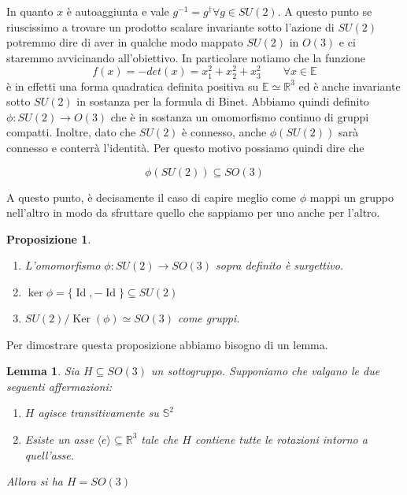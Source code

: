 \documentclass[11pt]{article}
\theoremstyle{plain}
\newtheorem{lemma}[thm]{Lemma}
\newtheorem{prop}[thm]{Proposizione}
\theoremstyle{definition}
\theoremstyle{remark}
\newcommand{\R}{\mathbb{R}}
\DeclareMathOperator{\Ker}{Ker}
\DeclareMathOperator{\Id}{Id}
\DeclareMathOperator{\iso}{\simeq}
\begin{document}
 In quanto $x$ è autoaggiunta e vale $g^{-1} = g^\dag \forall g \in SU(2)$. A questo punto se riuscissimo a trovare un prodotto scalare invariante sotto l'azione di $SU(2)$ potremmo dire di aver in qualche modo mappato $SU(2)$ in $O(3)$ e ci staremmo avvicinando all'obiettivo. In particolare notiamo che la funzione
 \[ f(x) = -det (x) = x_1 ^2 + x_2^2 + x_3^2 \qquad \forall x \in \mathbb{E}\]
 è in effetti una forma quadratica definita positiva su $\mathbb{E} \iso \R^3$ ed è anche invariante sotto $SU(2)$ in sostanza per la formula di Binet. Abbiamo quindi definito $\phi: SU(2) \to O(3)$ che è in sostanza un omomorfismo continuo di gruppi compatti. Inoltre, dato che $SU(2)$ è connesso, anche $\phi(SU(2))$ sarà connesso e conterrà l'identità. Per questo motivo possiamo quindi dire che

 \[ \phi(SU(2)) \subseteq SO(3) \]

 A questo punto, è decisamente il caso di capire meglio come $\phi$ mappi un gruppo nell'altro in modo da sfruttare quello che sappiamo per uno anche per l'altro.



 \begin{prop}
   \label{prop:omo su2 so3}
  \begin{enumerate}
    \item L'omomorfismo $\phi : SU(2) \to SO(3)$ sopra definito è surgettivo.
    \item $\ker \phi = \{\Id, -\Id\}\subseteq SU(2)$
    \item $SU(2) / \Ker(\phi) \iso SO(3)$ come gruppi.
  \end{enumerate}
  \end{prop}

Per dimostrare questa proposizione abbiamo bisogno di un lemma.


\begin{lemma}
  Sia $H \subseteq SO(3)$ un sottogruppo. Supponiamo che valgano le due seguenti affermazioni:

  \begin{enumerate}
  \item $H$ agisce transitivamente su $\mathbb{S}^2$
    \item Esiste un asse $\langle e \rangle \subseteq \R^3$ tale che $H$ contiene tutte le rotazioni intorno a quell'asse.
  \end{enumerate}

  Allora si ha $H = SO(3)$
\end{lemma}
\end{document}
